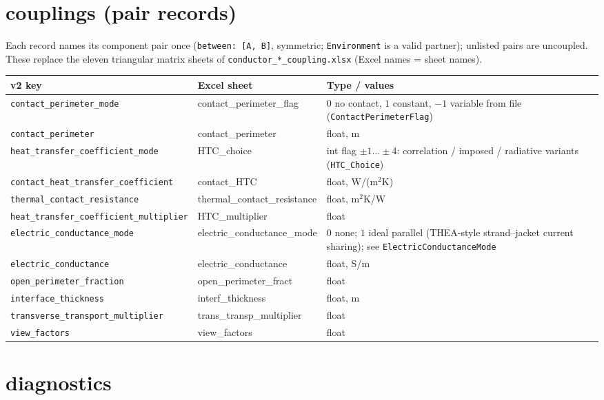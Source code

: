 \documentclass[10pt,a4paper]{article}
\newcommand{\code}[1]{\texttt{#1}}
\begin{document}
\section*{couplings (pair records)}

Each record names its component pair once (\code{between: [A, B]}, symmetric;
\code{Environment} is a valid partner); unlisted pairs are uncoupled. These
replace the eleven triangular matrix sheets of
\code{conductor\_*\_coupling.xlsx} (Excel names = sheet names).

\begin{longtable}{p{6.4cm}p{4.0cm}p{4.8cm}}
\toprule
\textbf{v2 key} & \textbf{Excel sheet} & \textbf{Type / values} \\
\midrule
\endhead
\code{contact\_perimeter\_mode} & contact\_perimeter\_flag & $0$ no contact, $1$ constant, $-1$ variable from file (\code{ContactPerimeterFlag}) \\
\code{contact\_perimeter} & contact\_perimeter & float, m \\
\code{heat\_transfer\_coefficient\_mode} & HTC\_choice & int flag $\pm1\dots\pm4$: correlation / imposed / radiative variants (\code{HTC\_Choice}) \\
\code{contact\_heat\_transfer\_coefficient} & contact\_HTC & float, W/(m$^2$K) \\
\code{thermal\_contact\_resistance} & thermal\_contact\_resistance & float, m$^2$K/W \\
\code{heat\_transfer\_coefficient\_multiplier} & HTC\_multiplier & float \\
\code{electric\_conductance\_mode} & electric\_conductance\_mode & $0$ none; $1$ ideal parallel (THEA-style strand--jacket current sharing); see \code{ElectricConductanceMode} \\
\code{electric\_conductance} & electric\_conductance & float, S/m \\
\code{open\_perimeter\_fraction} & open\_perimeter\_fract & float \\
\code{interface\_thickness} & interf\_thickness & float, m \\
\code{transverse\_transport\_multiplier} & trans\_transp\_multiplier & float \\
\code{view\_factors} & view\_factors & float \\
\bottomrule
\end{longtable}

\section*{diagnostics}
\end{document}
